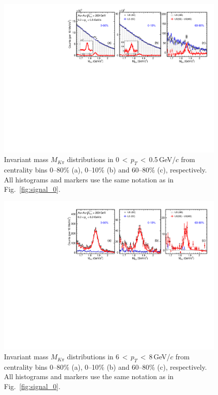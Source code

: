 \documentclass[%
 reprint,	
 amsmath,amssymb,
 aps,
 prc,
]{revtex4-1}
\begin{document}
\begin{figure}
\centering
\includegraphics[width=1.0\textwidth]{fig/signal2_0_05GeV.pdf}
\caption{Invariant mass $M_{K\pi}$ distributions in 0\,$<$\,$p_{T}$\,$<$\,0.5\,GeV/$c$ from centrality bins 0--80\% (a), 0--10\% (b) and 60--80\% (c), respectively. All histograms and markers use the same notation as in Fig.~\ref{fig:signal_0}.}
\label{fig:signal_1} 
\end{figure}

\begin{figure}
\centering
\includegraphics[width=1.0\textwidth]{fig/signal_6_8GeV.pdf}
\caption{Invariant mass $M_{K\pi}$ distributions in 6\,$<$\,$p_{T}$\,$<$\,8\,GeV/$c$ from centrality bins 0--80\% (a), 0--10\% (b) and 60--80\% (c), respectively. All histograms and markers use the same notation as in Fig.~\ref{fig:signal_0}.}
\label{fig:signal_2} 
\end{figure}
\end{document}
